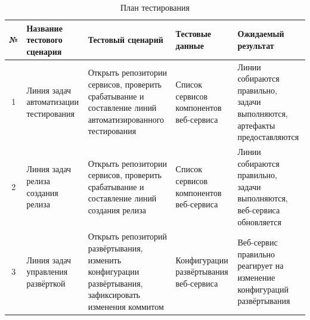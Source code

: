 \begin{center}
    \begin{longtable}{|c|p{}|p{}|p{}|p{}|}
        \caption{План тестирования}
        \label{tab:testing-plan}
        \hline
        № & Название тестового сценария             & Тестовый сценарий                                                                                         & Тестовые данные                           & Ожидаемый результат \\
        \hline
        1 & Линия задач автоматизации тестирования  & Открыть репозитории сервисов, проверить срабатывание и составление линий автоматизированного тестирования & Список сервисов компонентов веб-сервиса   & Линии собираются правильно, задачи выполняются, артефакты предоставляются \\
        \hline
        2 & Линия задач релиза создания релиза  & Открыть репозитории сервисов, проверить срабатывание и составление линий создания релиза & Список сервисов компонентов веб-сервиса   & Линии собираются правильно, задачи выполняются, веб-сервиса обновляется \\
        \hline
        3 & Линия задач управления развёрткой  & Открыть репозиторий развёртывания, изменить конфигурации развёртывания, зафиксировать изменения коммитом & Конфигурации развёртывания веб-сервиса   & Веб-сервис правильно реагирует на изменение конфигураций развёртывания \\
        \hline
    \end{longtable}
\end{center}


